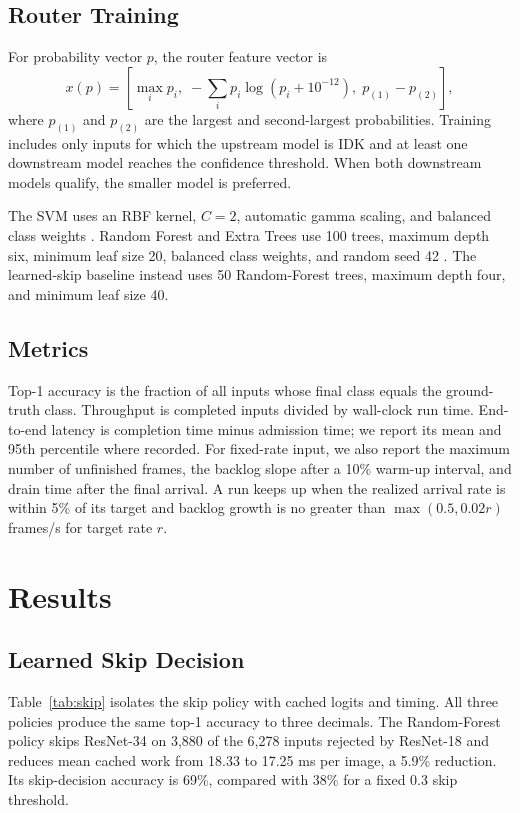 \subsection{Router Training}

For probability vector $p$, the router feature vector is
\begin{equation}
  x(p) = \left[\max_i p_i,\; -\sum_i p_i\log(p_i+10^{-12}),\;
  p_{(1)}-p_{(2)}\right],
\end{equation}
where $p_{(1)}$ and $p_{(2)}$ are the largest and second-largest
probabilities.  Training includes only inputs for which the upstream model is
IDK and at least one downstream model reaches the confidence threshold.  When
both downstream models qualify, the smaller model is preferred.

The SVM uses an RBF kernel, $C=2$, automatic gamma scaling, and balanced class
weights \cite{cortes1995svm}.  Random Forest and Extra Trees use 100 trees,
maximum depth six, minimum leaf size 20, balanced class weights, and random
seed 42 \cite{breiman2001randomforests,geurts2006extratrees}.  The learned-skip
baseline instead uses 50 Random-Forest trees, maximum depth four, and minimum
leaf size 40.

\subsection{Metrics}

Top-1 accuracy is the fraction of all inputs whose final class equals the
ground-truth class.  Throughput is completed inputs divided by wall-clock run
time.  End-to-end latency is completion time minus admission time; we report
its mean and 95th percentile where recorded.  For fixed-rate input, we also
report the maximum number of unfinished frames, the backlog slope after a 10\%
warm-up interval, and drain time after the final arrival.  A run keeps up when
the realized arrival rate is within 5\% of its target and backlog growth is no
greater than $\max(0.5,0.02r)$ frames/s for target rate $r$.

\section{Results}
\label{sec:results}

\subsection{Learned Skip Decision}

Table~\ref{tab:skip} isolates the skip policy with cached logits and timing.
All three policies produce the same top-1 accuracy to three decimals.  The
Random-Forest policy skips ResNet-34 on 3,880 of the 6,278 inputs rejected by
ResNet-18 and reduces mean cached work from 18.33 to 17.25 ms per image, a
5.9\% reduction.  Its skip-decision accuracy is 69\%, compared with 38\% for a
fixed 0.3 skip threshold.

